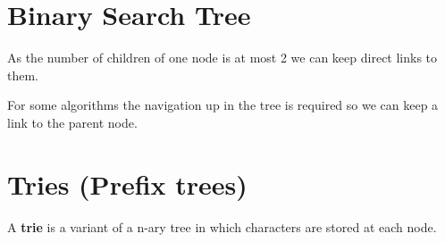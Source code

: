 \section{Binary Search Tree}

As the number of children of one node is at most 2 we can keep direct links to them.

For some algorithms the navigation up in the tree is required so we can keep a link to the parent node.

\section{Tries (Prefix trees)}

A \textbf{trie} is a variant of a n-ary tree in which characters are stored at each node.  

\cite{latexcompanion}

